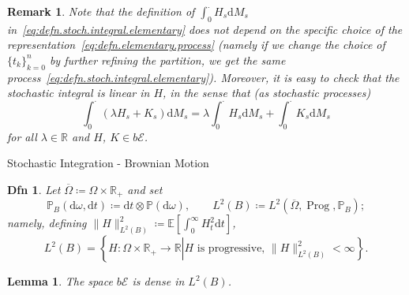 \documentclass[a4paper]{article}
\theoremstyle{mytheoremstyle}
\newtheorem{definition}{Dfn}
\newtheorem{lemma}{Lemma}
\newtheorem*{remark}{Remark}
\newcommand{\1}{\mathds{1}}
\begin{document}
\begin{multicols*}{3}
\begin{unlabeledbox}
\begin{remark}
  \label{rem:stoch.int.elementary.basic}Note that the definition of
  $\int_0^{\cdot} H_s \mathrm{d} M_s$
  in~\eqref{eq:defn.stoch.integral.elementary} does not depend on the specific
  choice of the representation~\eqref{eq:defn.elementary.process} (namely if
  we change the choice of $\{ t_k \}_{k = 0}^n$ by further refining the
  partition, we get the same
  process~\eqref{eq:defn.stoch.integral.elementary}). Moreover, it is easy to
  check that the stochastic integral is {\emph{linear in $H$}}, in the sense
  that (as stochastic processes)
  \[ \int_0^{\cdot} (\lambda H_s + K_s) \mathrm{d} M_s = \lambda \int_0^{\cdot}
     H_s \mathrm{d} M_s + \int_0^{\cdot} K_s \mathrm{d} M_s \]
  for all $\lambda \in \mathbb{R}$ and $H$, $K \in b \mathcal{E}$.
\end{remark}
\end{unlabeledbox}

\begin{roundbox}{Stochastic Integration - Brownian Motion}
\begin{definition}
  Let $\overline{\Omega} \coloneq \Omega \times \mathbb{R}_+$ and set
  \[ \mathbb{P}_B (\mathrm{d} \omega, \mathrm{d} t) \coloneq \mathrm{d} t \otimes
     \mathbb{P} (\mathrm{d} \omega), \qquad L^2 (B) \coloneq L^2
     (\overline{\Omega}, \operatorname{Prog}, \mathbb{P}_B) ; \]
  namely, defining $\|H\|_{L^2 (B)}^2 \coloneq \mathbb{E} \left[
  \int_0^{\infty} H^2_t \mathrm{d} t \right] $,
  {
  \small
  \[
     L^2 (B) = \left\{ H : \Omega \times \mathbb{R}_+ \rightarrow \mathbb{R}
     \left| H \text{ is progressive, } \|H\|_{L^2 (B)}^2 < \infty \right. \right\} .
  \]
  }
\end{definition}

\begin{lemma}
  \label{lem:bE-dense}The space $b\mathcal{E}$ is dense in $L^2 (B)$.
\end{lemma}


\end{roundbox}
\end{multicols*}
\end{document}
